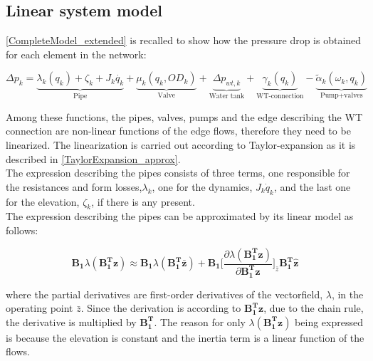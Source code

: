 %
%
%
%

\subsection{Linear system model}
 \label{SystemLin}
 
\eqref{CompleteModel_extended} is recalled to show how the pressure drop is obtained for each element in the network:

\begin{equation}
\label{CompleteModel_extended_2}
\Delta p_k \!= \! \underbrace{\lambda_k (q_k) \!+ \! \zeta_k \!+ \! J_k \dot{q_k}}_\text{Pipe} \!+ \!\underbrace{\mu_k (q_k,OD_k)}_\text{Valve}\! + \!\underbrace{\Delta p_{wt,k}}_\text{Water tank} \!+\! \underbrace{\gamma_k (q_k)}_\text{WT-connection}\! -\! \underbrace{\tilde{\alpha}_k(\omega_k,q_k)}_\text{Pump+valves}
\end{equation}

Among these functions, the pipes, valves, pumps and the edge describing the WT connection are non-linear functions of the edge flows, therefore they need to be linearized. The linearization is carried out according to Taylor-expansion as it is described in \eqref{TaylorExpansion_approx}.
\\
The expression describing the pipes consists of three terms, one responsible for the resistances and form losses,$\lambda_k$, one for the dynamics, $J_k\dot{q}_k$, and the last one for the elevation, $\zeta_k$, if there is any present. 
\\
The expression describing the pipes can be approximated by its linear model as follows:

\begin{equation}
  \bm{B_1} \lambda(\bm{{B_1^{T}}}\bm{z}) \approx  \bm{B_1} \lambda(\bm{B_1^T \bar{ z}}) + \bm{B_1} \bigg[ \frac{\partial{\lambda(\bm{{B_1^{T}}}\bm{z})}}{{\partial{\bm{{B_1^{T}}}\bm{z}}}}   \bigg]_{\bar{z}} \bm{{B_1^{T}}}\bm{\hat{z}}
\label{lambda_lin}
\end{equation}

where the partial derivatives are first-order derivatives of the vectorfield, $\lambda$, in the operating point $\bar{z}$. Since the derivation is according to $\bm{{B_1^{T}}}\bm{z}$, due to the chain rule, the derivative is multiplied by $\bm{{B_1^{T}}}$. The reason for only $\lambda(\bm{{B_1^{T}}}\bm{z})$ being expressed is because the elevation is constant and the inertia term is a linear function of the flows. 

